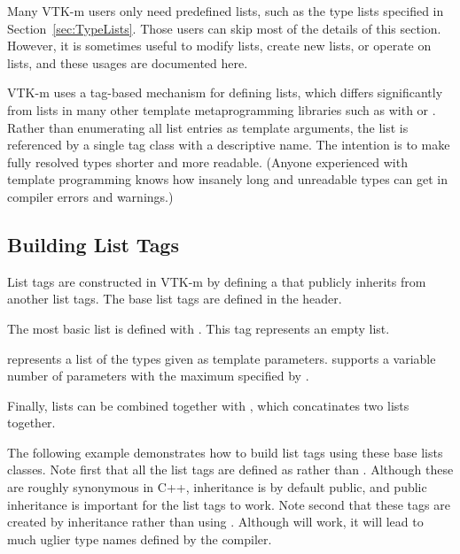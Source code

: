 Many VTK-m users only need predefined lists, such as the type lists
specified in Section~\ref{sec:TypeLists}. Those users can skip most of the
details of this section. However, it is sometimes useful to modify lists,
create new lists, or operate on lists, and these usages are documented
here.

VTK-m uses a tag-based mechanism for defining lists, which differs
significantly from lists in many other template metaprogramming libraries
such as with  or
. Rather than enumerating all list
entries as template arguments, the list is referenced by a single tag class
with a descriptive name. The intention is to make fully resolved types
shorter and more readable. (Anyone experienced with template programming
knows how insanely long and unreadable types can get in compiler errors and
warnings.)

\subsection{Building List Tags}
\label{sec:BuildingListTags}

List tags are constructed in VTK-m by defining a  that
publicly inherits from another list tags. The base list tags are defined in
the  header.

The most basic list is defined with . This tag
represents an empty list.

 represents a list of the types given as
template parameters.  supports a variable number of
parameters with the maximum specified by .

Finally, lists can be combined together with
, which concatinates two lists
together.

The following example demonstrates how to build list tags using these base
lists classes. Note first that all the list tags are defined as
 rather than . Although these are roughly
synonymous in C++,  inheritance is by default public, and
public inheritance is important for the list tags to work. Note second that
these tags are created by inheritance rather than using
. Although  will work, it will lead to
much uglier type names defined by the compiler.

